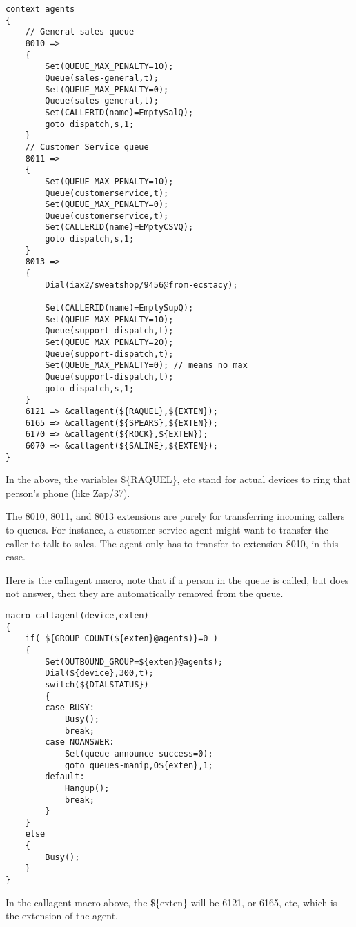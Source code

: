 \begin{astlisting}
\begin{verbatim}
context agents
{
	// General sales queue
	8010 =>
	{
		Set(QUEUE_MAX_PENALTY=10);
		Queue(sales-general,t);
		Set(QUEUE_MAX_PENALTY=0);
		Queue(sales-general,t);
		Set(CALLERID(name)=EmptySalQ);
		goto dispatch,s,1;
	}
	// Customer Service queue
	8011 =>
	{
		Set(QUEUE_MAX_PENALTY=10);
		Queue(customerservice,t);
		Set(QUEUE_MAX_PENALTY=0);
		Queue(customerservice,t);
		Set(CALLERID(name)=EMptyCSVQ);
		goto dispatch,s,1;
	}
	8013 =>
	{
		Dial(iax2/sweatshop/9456@from-ecstacy);

		Set(CALLERID(name)=EmptySupQ);
		Set(QUEUE_MAX_PENALTY=10);
		Queue(support-dispatch,t);
		Set(QUEUE_MAX_PENALTY=20);
		Queue(support-dispatch,t);
		Set(QUEUE_MAX_PENALTY=0); // means no max
		Queue(support-dispatch,t);
		goto dispatch,s,1;
	}
	6121 => &callagent(${RAQUEL},${EXTEN});
	6165 => &callagent(${SPEARS},${EXTEN});
	6170 => &callagent(${ROCK},${EXTEN});
	6070 => &callagent(${SALINE},${EXTEN});
}
\end{verbatim}
\end{astlisting}

In the above, the variables \$\{RAQUEL\}, etc stand for
actual devices to ring that person's
phone (like Zap/37).

The 8010, 8011, and 8013 extensions are purely for transferring
incoming callers to queues. For instance, a customer service
agent might want to transfer the caller to talk to sales. The
agent only has to transfer to extension 8010, in this case.

Here is the callagent macro, note that if a person in the
queue is called, but does not answer, then they are automatically
removed from the queue.

\begin{astlisting}
\begin{verbatim}
macro callagent(device,exten)
{
	if( ${GROUP_COUNT(${exten}@agents)}=0 )
	{
		Set(OUTBOUND_GROUP=${exten}@agents);
		Dial(${device},300,t);
		switch(${DIALSTATUS})
		{
		case BUSY:
			Busy();
			break;
		case NOANSWER:
			Set(queue-announce-success=0);
			goto queues-manip,O${exten},1;
		default:
			Hangup();
			break;
		}
	}
	else
	{
		Busy();
	}
}
\end{verbatim}
\end{astlisting}

In the callagent macro above, the \$\{exten\} will
be 6121, or 6165, etc, which is the extension of the agent.

